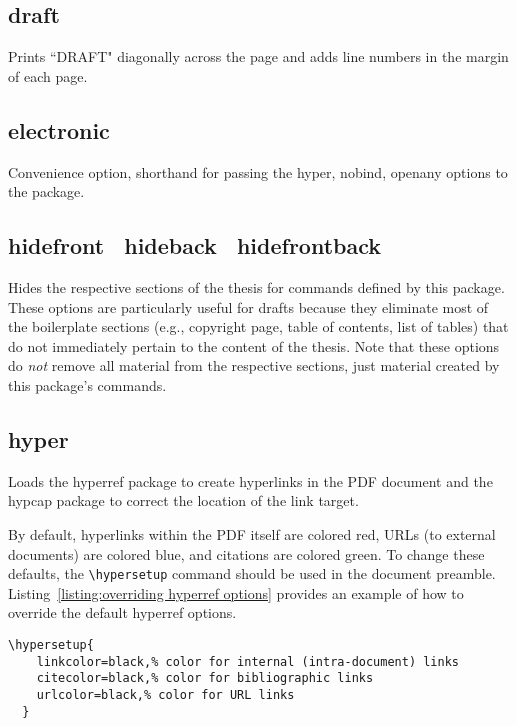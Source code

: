 \documentclass[10pt]{article}
\newcommand{\package}[1]{#1}
\newcommand{\option}[1]{#1}
\newcommand{\command}[1]{\texttt{\textbackslash#1}}
\begin{document}
\subsection{\option{draft}}
Prints ``DRAFT" diagonally across the page and adds line numbers in the margin of each page.

\subsection{\option{electronic}}
Convenience option, shorthand for passing the \option{hyper}, \option{nobind}, \option{openany} options to the package.

\subsection{\option{hidefront} \textbar\ \option{hideback} \textbar\ \option{hidefrontback}}
Hides the respective sections of the thesis for commands defined by this package.
These options are particularly useful for drafts because they eliminate most of the boilerplate sections (e.g., copyright page, table of contents, list of tables) that do not immediately pertain to the content of the thesis.
Note that these options do \emph{not} remove all material from the respective sections, just material created by this package's commands.

\subsection{\option{hyper}}
Loads the \package{hyperref} package to create hyperlinks in the PDF document and the \package{hypcap} package to correct the location of the link target.

By default, hyperlinks within the PDF itself are colored red, URLs (to external documents) are colored blue, and citations are colored green.
To change these defaults, the \command{hypersetup} command should be used in the document preamble.
Listing~\ref{listing:overriding hyperref options} provides an example of how to override the default \package{hyperref} options.

\begin{lstlisting}[gobble=2,float=tb,caption={
    An example of overriding the default \package{hyperref} options.
    All links will be colored black by default.
  },label={listing:overriding hyperref options}]
  \hypersetup{
    linkcolor=black,% color for internal (intra-document) links
    citecolor=black,% color for bibliographic links
    urlcolor=black,% color for URL links
  }
\end{lstlisting}
\end{document}
